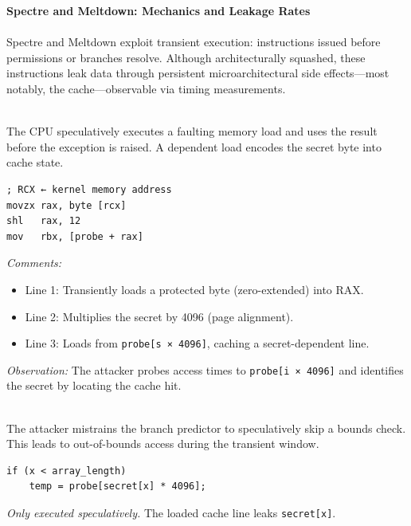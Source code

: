 \begin{technical}
{\Large\textbf{Spectre and Meltdown: Mechanics and Leakage Rates}}\\[0.3em]

\\[0.5em]
Spectre and Meltdown exploit transient execution: instructions issued before permissions or branches resolve. Although architecturally squashed, these instructions leak data through persistent microarchitectural side effects—most notably, the cache—observable via timing measurements.

\vspace{0.4em}
\\[0.5em]
The CPU speculatively executes a faulting memory load and uses the result before the exception is raised. A dependent load encodes the secret byte into cache state.

\begin{verbatim}
; RCX ← kernel memory address
movzx rax, byte [rcx]
shl   rax, 12
mov   rbx, [probe + rax]
\end{verbatim}
\vspace{-0.5em}
\textit{Comments:}
\begin{itemize}[noitemsep,topsep=0pt]
\item Line 1: Transiently loads a protected byte (zero-extended) into RAX.
\item Line 2: Multiplies the secret by 4096 (page alignment).
\item Line 3: Loads from \texttt{probe[s × 4096]}, caching a secret-dependent line.
\end{itemize}

\textit{Observation:} The attacker probes access times to \texttt{probe[i × 4096]} and identifies the secret by locating the cache hit.

\vspace{0.4em}
\\[0.5em]
The attacker mistrains the branch predictor to speculatively skip a bounds check. This leads to out-of-bounds access during the transient window.

\begin{verbatim}
if (x < array_length)
    temp = probe[secret[x] * 4096];
\end{verbatim}
\vspace{-0.5em}
\textit{Only executed speculatively.} The loaded cache line leaks \texttt{secret[x]}.


\end{technical}
